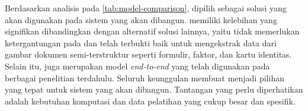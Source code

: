 Berdasarkan analisis pada \autoref{tab:model-comparison}, \donut{} dipilih sebagai solusi yang akan digunakan pada sistem yang akan dibangun. \donut{} memiliki kelebihan yang signifikan dibandingkan dengan alternatif solusi lainnya, yaitu tidak memerlukan ketergantungan pada \ocr{} dan telah terbukti baik untuk mengekstrak data dari gambar dokumen semi-terstruktur seperti formulir, faktor, dan kartu identitas. Selain itu, \donut{} juga merupakan model \sota{} \emph{end-to-end} yang telah digunakan pada berbagai penelitian terdahulu. Seluruh keunggulan \donut{} membuat \donut{} menjadi pilihan yang tepat untuk sistem yang akan dibangun. Tantangan yang perlu diperhatikan adalah kebutuhan komputasi dan data pelatihan yang cukup besar dan spesifik.


